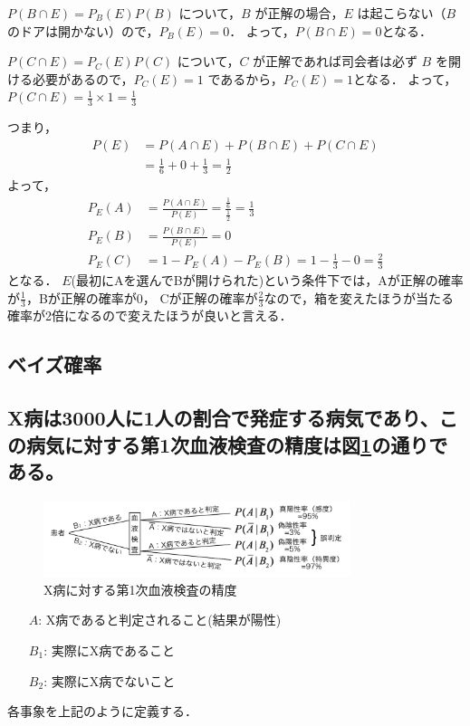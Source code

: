 \documentclass[titlepage,a4paper]{jsarticle}
\begin{document}
$P(B \cap E) = P_B(E) P(B)$ について，$B$ が正解の場合，$E$ は起こらない（$B$ のドアは開かない）ので，$P_B(E) = 0$．
よって，$P(B \cap E) = 0$となる．

$P(C \cap E) = P_C(E) P(C)$ について，$C$ が正解であれば司会者は必ず $B$ を開ける必要があるので，$P_C(E) = 1$ であるから，$P_C(E) = 1$となる．
よって，$P(C \cap E) = \frac{1}{3} \times 1 = \frac{1}{3}$

つまり，
\begin{align}
  P(E) & = P(A \cap E) + P(B \cap E) + P(C \cap E)     \\
       & = \frac{1}{6} + 0 + \frac{1}{3} = \frac{1}{2}
\end{align}
よって，
\begin{align}
  P_E(A) & = \frac{P(A \cap E)}{P(E)} = \frac{\frac{1}{6}}{\frac{1}{2}} = \frac{1}{3}\label{aa} \\
  P_E(B) & = \frac{P(B \cap E)}{P(E)} = 0\label{bb}                                             \\
  P_E(C) & = 1 - P_E(A) - P_E(B) = 1 - \frac{1}{3} - 0 = \frac{2}{3}\label{cc}
\end{align}
となる．
$E$(最初にAを選んでBが開けられた)という条件下では，Aが正解の確率が$\frac{1}{3}$，Bが正解の確率が$0$，
Cが正解の確率が$\frac{2}{3}$なので，箱を変えたほうが当たる確率が2倍になるので変えたほうが良いと言える．

\subsection{ベイズ確率}
\subsection*{X病は3000人に1人の割合で発症する病気であり、この病気に対する第1次血液検査の精度は図\ref{toi6}の通りである。}
\begin{figure}[H]
  \centering
  \includegraphics[width=0.8\textwidth]{img/toi6.png}
  \caption{X病に対する第1次血液検査の精度}
  \label{toi6}
\end{figure}
\begin{itemize}
  \item[$A$:] X病であると判定されること(結果が陽性)
  \item[$B_1$:] 実際にX病であること
  \item[$B_2$:] 実際にX病でないこと
\end{itemize}
各事象を上記のように定義する．
\end{document}
